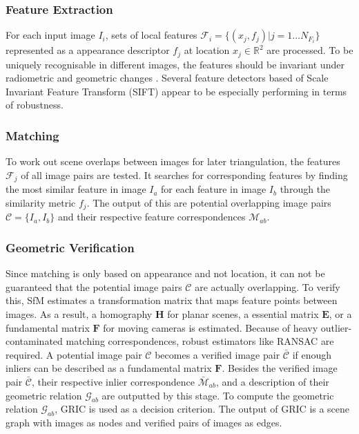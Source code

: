 \documentclass[conference,]{IEEEtran}
\begin{document}
\hypertarget{feature-extraction}{%
\subsubsection{Feature Extraction}\label{feature-extraction}}

For each input image \(I_i\), sets of local features
\(\mathcal{F}_i=\{(x_j,f_j)|j=1\dots N_{F_i}\}\) represented as a
appearance descriptor \(f_j\) at location \(x_j\in \mathbb{R}^2\) are
processed. To be uniquely recognisable in different images, the features
should be invariant under radiometric and geometric changes
\autocite{mcglone2004}. Several feature detectors based of Scale
Invariant Feature Transform (SIFT) \autocite{lowe1999,tuytelaars2008}
appear to be especially performing in terms of robustness.
\autocite{schönberger2016}

\hypertarget{matching}{%
\subsubsection{Matching}\label{matching}}

To work out scene overlaps between images for later triangulation, the
features \(\mathcal{F}_j\) of all image pairs are tested. It searches
for corresponding features by finding the most similar feature in image
\(I_a\) for each feature in image \(I_b\) through the similarity metric
\(f_j\). The output of this are potential overlapping image pairs
\(\mathcal{C}=\{I_a,I_b\}\) and their respective feature correspondences
\(\mathcal{M}_{ab}\).\autocite{schönberger2016}

\hypertarget{geometric-verification}{%
\subsubsection{Geometric Verification}\label{geometric-verification}}

Since matching is only based on appearance and not location, it can not
be guaranteed that the potential image pairs \(\mathcal{C}\) are
actually overlapping. To verify this, SfM estimates a transformation
matrix that maps feature points between images. As a result, a
homography \(\mathbf{H}\) for planar scenes, a essential matrix
\(\mathbf{E}\), or a fundamental matrix \(\mathbf{F}\) for moving
cameras is estimated. Because of heavy outlier-contaminated matching
correspondences, robust estimators like RANSAC \autocite{fischler1981}
are required. A potential image pair \(\mathcal{C}\) becomes a verified
image pair \(\bar{\mathcal{C}}\) if enough inliers can be described as a
fundamental matrix \(\mathbf{F}\). Besides the verified image pair
\(\bar{\mathcal{C}}\), their respective inlier correspondence
\(\bar{\mathcal{M}}_{ab}\), and a description of their geometric
relation \(\mathcal{G}_{ab}\) are outputted by this stage. To compute
the geometric relation \(\mathcal{G}_{ab}\), GRIC \autocite{torr1997} is
used as a decision criterion. The output of GRIC is a scene graph with
images as nodes and verified pairs of images as edges.
\autocite{schönberger2016}
\end{document}
